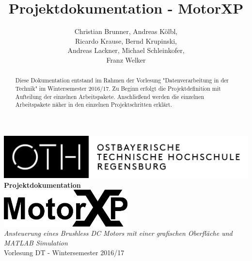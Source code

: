 \documentclass[a4paper,11pt]{report}
\title{Projektdokumentation - MotorXP}
\author{Christian Brunner, Andreas Kölbl, \\
  Ricardo Krause, Bernd Krupinski, \\
  Andreas Lackner, Michael Schleinkofer, \\
  Franz Welker}
\begin{document}
\makeatletter
\begin{titlepage}
  \centering
  \vspace*{0.02\textheight}
  \includegraphics[width=\textwidth]{images/OTHLogo}\vspace*{0.1\textheight}
  {\huge\textbf{\\Projektdokumentation\\}}\vspace*{0.05\textheight}
  \includegraphics[height=2cm]{images/MotorXP}\vspace*{0.05\textheight}
  {\large\textit{\\Ansteuerung eines Brushless DC Motors mit einer grafischen Oberfläche und MATLAB Simulation}}\vspace*{0.03\textheight}
  {\\Vorlesung DT - Wintersemester 2016/17\\}\vspace*{0.2\textheight}
  {\@author}
\end{titlepage}
\makeatother
\tableofcontents

\begin{abstract}
Diese Dokumentation entstand im Rahmen der Vorlesung "Datenverarbeitung in der Technik" im Wintersemester 2016/17. Zu Beginn erfolgt die
Projektdefinition mit Aufteilung der einzelnen Arbeitspakete. Anschließend werden die einzelnen Arbeitspakete näher in den einzelnen Projektschritten erklärt.
\end{abstract}






\listoffigures
\listoftables
\appendix


\end{document}
